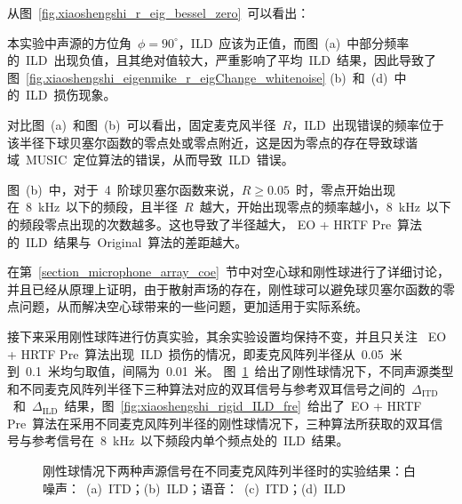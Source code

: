 从图~\ref{fig.xiaoshengshi_r_eig_bessel_zero}~可以看出：

\begin{inparaenum}[（1）]

\item 本实验中声源的方位角~$\phi=90^{\circ}$，ILD~应该为正值，而图~(a)~中部分频率的~ILD~出现负值，且其绝对值较大，严重影响了平均~ILD~结果，因此导致了图~\ref{fig.xiaoshengshi_eigenmike_r_eigChange_whitenoise} (b)~和~(d)~中的~ILD~损伤现象。

\item 对比图~(a)~和图~(b)~可以看出，固定麦克风半径~$R$，ILD~出现错误的频率位于该半径下球贝塞尔函数的零点处或零点附近，这是因为零点的存在导致球谐域~MUSIC~定位算法的错误，从而导致~ILD~错误。

\item 图~(b)~中，对于~4~阶球贝塞尔函数来说，$R\geq0.05$~时，零点开始出现在~8~kHz~以下的频段，且半径~$R$~越大，开始出现零点的频率越小，8~kHz~以下的频段零点出现的次数越多。这也导致了半径越大， EO + HRTF Pre~算法的~ILD~结果与~Original~算法的差距越大。
\end{inparaenum}



在第~\ref{section_microphone_array_coe}~节中对空心球和刚性球进行了详细讨论，并且已经从原理上证明，由于散射声场的存在，刚性球可以避免球贝塞尔函数的零点问题，从而解决空心球带来的一些问题，更加适用于实际系统。

接下来采用刚性球阵进行仿真实验，其余实验设置均保持不变，并且只关注~ EO + HRTF Pre~算法出现~ILD~损伤的情况，即麦克风阵列半径从~0.05~米到~0.1~米均匀取值，间隔为~0.01~米。
图~\ref{fig.rigid_xiaoshengshi_r_eig_whitenoise}~给出了刚性球情况下，不同声源类型和不同麦克风阵列半径下三种算法对应的双耳信号与参考双耳信号之间的~$\Delta_{\text{ITD}}$~和~$\Delta_{\text{ILD}}$~结果，图~\ref{fig:xiaoshengshi_rigid_ILD_fre}~给出了~EO + HRTF Pre~算法在采用不同麦克风阵列半径的刚性球情况下，三种算法所获取的双耳信号与参考信号在~8~kHz~以下频段内单个频点处的~ILD~结果。

\begin{figure}[H]
\centering
{}
\hfill
{}
\vfill
{}
\hfill
{}
\caption{刚性球情况下两种声源信号在不同麦克风阵列半径时的实验结果：白噪声：~(a)~ITD；(b)~ILD；语音：~(c)~ITD；(d)~ILD}
\label{fig.rigid_xiaoshengshi_r_eig_whitenoise}
\end{figure}

